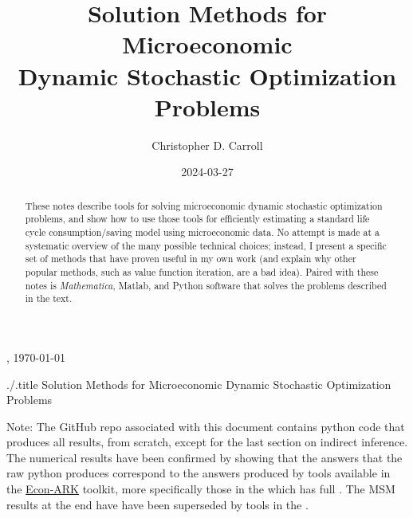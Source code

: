 \documentclass[titlepage, headings=optiontotocandhead]{\econtex}
\begin{document}
\renewcommand{\onlyinsubfile}[1]{}\renewcommand{\notinsubfile}[1]{#1}

\hfill{\tiny \jobname, \today}

\begin{verbatimwrite}{./\texname.title}
  Solution Methods for Microeconomic Dynamic Stochastic Optimization Problems
\end{verbatimwrite}

\title{Solution Methods for Microeconomic \\ Dynamic Stochastic Optimization Problems}

\author{Christopher D. Carroll\authNum}


\date{2024-03-27}
\maketitle
\footnotesize

\noindent  Note: The GitHub repo {\SMDSOPrepo} associated with this document contains python code that produces all results, from scratch, except for the last section on indirect inference.  The numerical results have been confirmed by showing that the answers that the raw python produces correspond to the answers produced by tools available in the \href{https://econ-ark.org}{Econ-ARK} toolkit, more specifically those in the {\HARKrepo} which has full {\HARKdocs}.  The MSM results at the end have have been superseded by tools in the {\EMDSOPrepo}.

\normalsize

\hypertarget{Abstract}{}
\begin{abstract}
  These notes describe tools for solving microeconomic dynamic stochastic optimization problems, and show how to use those tools for efficiently estimating a standard life cycle consumption/saving model using microeconomic data.  No attempt is made at a systematic overview of the many possible technical choices; instead, I present a specific set of methods that have proven useful in my own work (and explain why other popular methods, such as value function iteration, are a bad idea).  Paired with these notes is \textit{Mathematica}, Matlab, and Python software that solves the problems described in the text.
\end{abstract}
\end{document}

